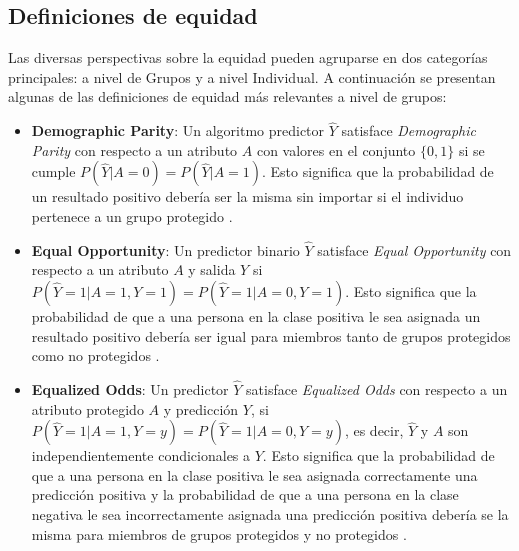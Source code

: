 \subsection{Definiciones de equidad}
Las diversas perspectivas sobre la equidad pueden agruparse en dos categor\'ias principales: a nivel de Grupos y a nivel Individual. 
A continuaci\'on se presentan algunas de las definiciones de equidad m\'as relevantes a nivel de grupos:

\begin{itemize}
    \item \textbf{Demographic Parity}: Un algoritmo predictor $\hat{Y}$ satisface \textit{Demographic Parity}
    con respecto a un atributo $A$ con valores en el conjunto $\{0,1\}$ si se cumple $P(\hat{Y} | A = 0) = P(\hat{Y} | A = 1)$. 
    Esto significa que la probabilidad de un resultado positivo debería ser la misma sin importar si el individuo pertenece a
    un grupo protegido \parencite{fairness_def}.

    \item \textbf{Equal Opportunity}: Un predictor binario $\hat{Y}$ satisface \textit{Equal Opportunity} con 
    respecto a un atributo $A$ y salida $Y$ si $P(\hat{Y} = 1 | A = 1, Y = 1) = P(\hat{Y} = 1 | A = 0, Y = 1)$. Esto significa
    que la probabilidad de que a una persona en la clase positiva le sea asignada un resultado positivo 
    deber\'ia ser igual para miembros tanto de grupos protegidos como no protegidos \parencite{fairness_def}.

    \item \textbf{Equalized Odds}: Un predictor $\hat{Y}$ satisface \textit{Equalized Odds} con respecto a un atributo
    protegido $A$ y predicci\'on $Y$, si $P(\hat{Y} = 1 | A = 1, Y = y) = P(\hat{Y} = 1 | A = 0, Y = y)$, es decir,
    $\hat{Y}$ y $A$ son independientemente condicionales a $Y$. Esto significa que la probabilidad de que a una persona 
    en la clase positiva le sea asignada correctamente una predicci\'on positiva y la probabilidad de que a una persona en la 
    clase negativa le sea incorrectamente asignada una predicci\'on positiva deber\'ia se la misma para miembros de grupos 
    protegidos y no protegidos \parencite{fairness_def}.
\end{itemize}



